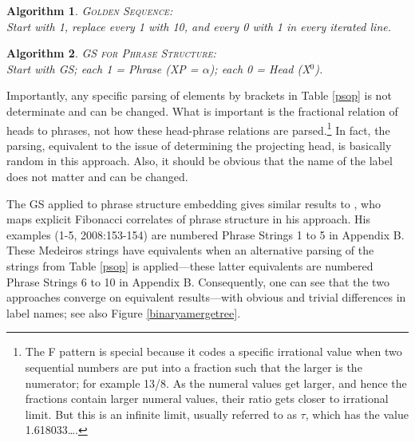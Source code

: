 \documentclass[11pt,twoside]{article}
\theoremstyle{plain}
\newtheorem{algorithm}{Algorithm}
\numberwithin{equation}{section}
\theoremstyle{definition}
\newtheorem{phrase string}{Phrase String}
\begin{document}
\begin{algorithm}\textsc{Golden Sequence:}\\
Start with 1, replace every 1 with 10, and every 0 with 1 in every iterated line.\label{gsalgo}  
\end{algorithm}

\begin{algorithm}\textsc{GS for Phrase Structure:}\\
Start with GS; each 1 = Phrase (XP = $\alpha$); each 0 = Head (X$^{0}$).\label{psalgo}
\end{algorithm}

Importantly, any specific parsing of elements by brackets in Table \ref{psop} is not determinate and can be changed. What is important is the fractional relation of heads to phrases, not how these head-phrase relations are parsed.\footnote{The F pattern is special because it codes a specific irrational value when two sequential numbers are put into a fraction such that the larger is the numerator; for example 13/8. As the numeral values get larger, and hence the fractions contain larger numeral values, their ratio gets closer to irrational limit. But this is an infinite limit, usually referred to as $\tau$, which has the value 1.618033\ldots.} In fact, the parsing, equivalent to the issue of determining the projecting head, is basically random in this approach. Also, it should be obvious that the name of the label does not matter and can be changed. 

The GS applied to phrase structure embedding gives similar results to \cite{medeiros:2008}, who maps explicit Fibonacci correlates of phrase structure in his approach. His examples (1-5, 2008:153-154) are numbered Phrase Strings 1 to 5 in Appendix B. These Medeiros strings have equivalents when an alternative parsing of the strings from Table \ref{psop} is applied---these latter equivalents are numbered Phrase Strings 6 to 10 in Appendix B. Consequently, one can see that the two approaches converge on equivalent results---with obvious and trivial differences in label names; see also Figure \ref{binaryamergetree}.
\end{document}
